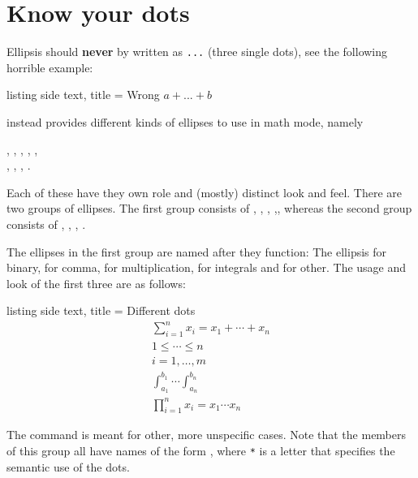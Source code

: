 \documentclass[a4paper, 10pt, headings=standardclasses, oneside, bibliography=totocnumbered]{scrbook}
\begin{document}
\section{Know your dots}
Ellipsis should \textbf{never} by written as \texttt{...} (three single dots), see the following horrible example:
\begin{tcblisting}{listing side text, title = {Wrong}}
$a + ... + b$
\end{tcblisting}
 instead provides different kinds of ellipses to use in math mode, namely
\begin{center}
    ,
    \quad
    ,
    \quad
    ,
    \quad
    ,
    \quad
    ,
    \\
    ,
    \quad
    ,
    \quad
    ,
    \quad
    .
\end{center}
Each of these have they own role and (mostly) distinct look and feel.
There are two groups of ellipses.
The first group consists of , , , ,, whereas the second group consists of , , , .

The ellipses in the first group are named after they function:
The ellipsis  for binary,  for comma,  for multiplication,  for integrals and  for other.
The usage and look of the first three are as follows:
\begin{tcblisting}{listing side text, title = {Different dots}}
\begin{gather*}
  \sum_{i=1}^n x_i
  =
  x_1 + \dotsb + x_n 
  \\
  1 \leq \dotsb \leq n 
  \\
  i = 1, \dotsc, m
  \\
  \int_{a_1}^{b_1}
  \dotsi
  \int_{a_n}^{b_n}
  \\
  \prod_{i=1}^n x_i
  =
  x_1 \dotsm x_n
\end{gather*}
\end{tcblisting}
The command  is meant for other, more unspecific cases.
Note that the members of this group all have names of the form , where \texttt{*} is a letter that specifies the semantic use of the dots.
\end{document}
